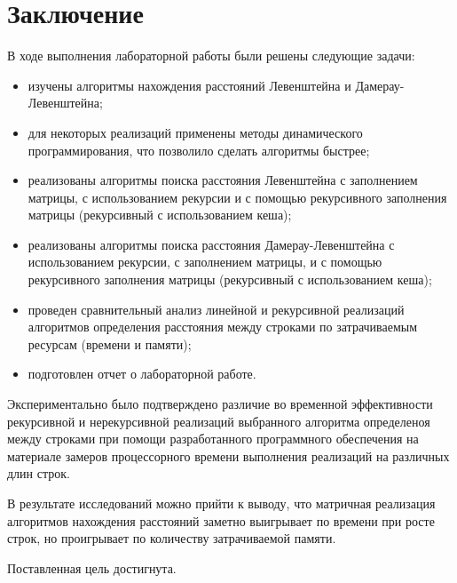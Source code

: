 \chapter*{Заключение}

В ходе выполнения лабораторной работы были решены следующие задачи:

\begin{itemize}
    \item изучены алгоритмы нахождения расстояний Левенштейна и Дамерау-Левенштейна;
	\item для некоторых реализаций применены методы динамического программирования, что позволило сделать алгоритмы быстрее;
	\item реализованы алгоритмы поиска расстояния Левенштейна с заполнением матрицы, с использованием рекурсии и с помощью рекурсивного заполнения матрицы (рекурсивный с использованием кеша);
	\item реализованы алгоритмы поиска расстояния Дамерау-Левенштейна с использованием рекурсии, с заполнением матрицы, и с помощью рекурсивного заполнения матрицы (рекурсивный с использованием кеша);
	\item проведен сравнительный анализ линейной и рекурсивной реализаций алгоритмов определения расстояния между строками по затрачиваемым ресурсам (времени и памяти);
	\item подготовлен отчет о лабораторной работе.
\end{itemize}

Экспериментально было подтверждено различие во временной эффективности рекурсивной и нерекурсивной реализаций выбранного алгоритма определеноя между строками при помощи разработанного программного обеспечения на материале замеров процессорного времени выполнения реализаций на различных длин строк.

В результате исследований можно прийти к выводу, что матричная реализация алгоритмов нахождения расстояний заметно выигрывает по времени при росте строк, но проигрывает по количеству затрачиваемой памяти.

Поставленная цель достигнута.
